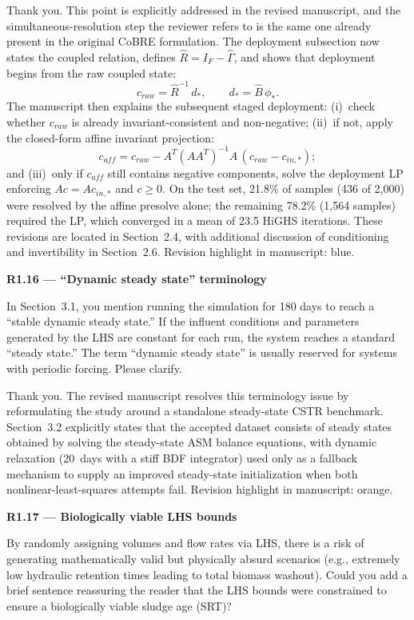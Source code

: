\documentclass[a4paper,11pt]{article}
\newcommand{\reviewlabel}[1]{\noindent\textbf{\textcolor{accentblue}{#1}}\par\medskip}
\newcommand{\revhighlight}[2]{\textcolor{#1}{Revision highlight in manuscript: #2.}}
\begin{document}
Thank you. This point is explicitly addressed in the revised manuscript, and the simultaneous-resolution step the reviewer refers to is the same one already present in the original CoBRE formulation. The deployment subsection now states the coupled relation, defines $\widehat{R} = I_F - \widehat{\Gamma}$, and shows that deployment begins from the raw coupled state:
\[
c_{raw} = \widehat{R}^{-1}\,d_*, \qquad d_* = \widehat{B}\,\phi_*.
\]
The manuscript then explains the subsequent staged deployment: (i)~check whether $c_{raw}$ is already invariant-consistent and non-negative; (ii)~if not, apply the closed-form affine invariant projection:
\[
c_{aff} = c_{raw} - A^T(AA^T)^{-1}A\,(c_{raw} - c_{in,*});
\]
and (iii)~only if $c_{aff}$ still contains negative components, solve the deployment LP enforcing $Ac = Ac_{in,*}$ and $c \ge 0$. On the test set, 21.8\% of samples (436 of 2,000) were resolved by the affine presolve alone; the remaining 78.2\% (1,564 samples) required the LP, which converged in a mean of 23.5 HiGHS iterations. These revisions are located in Section~2.4, with additional discussion of conditioning and invertibility in Section~2.6. \revhighlight{revDefault}{blue}

\reviewlabel{R1.16 --- ``Dynamic steady state'' terminology}
\begin{reviewbox}
In Section~3.1, you mention running the simulation for 180 days to reach a ``stable dynamic steady state.'' If the influent conditions and parameters generated by the LHS are constant for each run, the system reaches a standard ``steady state.'' The term ``dynamic steady state'' is usually reserved for systems with periodic forcing. Please clarify.
\end{reviewbox}

Thank you. The revised manuscript resolves this terminology issue by reformulating the study around a standalone steady-state CSTR benchmark. Section~3.2 explicitly states that the accepted dataset consists of steady states obtained by solving the steady-state ASM balance equations, with dynamic relaxation (20~days with a stiff BDF integrator) used only as a fallback mechanism to supply an improved steady-state initialization when both nonlinear-least-squares attempts fail. \revhighlight{revRoneSixteen}{orange}

\reviewlabel{R1.17 --- Biologically viable LHS bounds}
\begin{reviewbox}
By randomly assigning volumes and flow rates via LHS, there is a risk of generating mathematically valid but physically absurd scenarios (e.g., extremely low hydraulic retention times leading to total biomass washout). Could you add a brief sentence reassuring the reader that the LHS bounds were constrained to ensure a biologically viable sludge age (SRT)?
\end{reviewbox}
\end{document}
